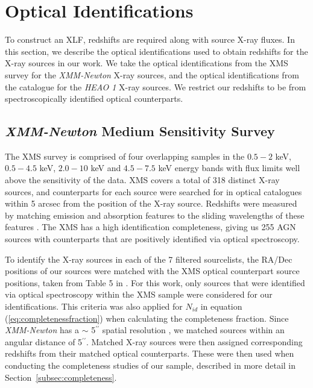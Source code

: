 \documentclass[fleqn,usenatbib]{mnras}
\begin{document}
\section{Optical Identifications}\label{sec:opticalid}

To construct an XLF, redshifts are required along with source X-ray fluxes. 
In this section, we describe the optical identifications used to obtain redshifts for the X-ray sources in our work.
We take the optical identifications from the XMS survey for the \textit{XMM-Newton} X-ray sources, and the optical identifications from the \cite{piccinotti1982heao1xlf} catalogue for the \textit{HEAO 1} X-ray sources.
We restrict our redshifts to be from spectroscopically identified optical counterparts.

	\subsection{\textit{XMM-Newton} Medium Sensitivity Survey}\label{subsec:xmssurvey}  

	The XMS survey is comprised of four overlapping samples in the $0.5-2$ keV, $0.5-4.5$ keV, $2.0-10$ keV and $4.5-7.5$ keV energy bands with flux limits well above the sensitivity of the data. 
	XMS covers a total of 318 distinct X-ray sources, and counterparts for each source were searched for in optical catalogues within 5 arcsec from the position of the X-ray source.
	Redshifts were measured by matching emission and absorption features to the sliding wavelengths of these features \citep{barcons2007xmm}. 
	The XMS has a high identification completeness, giving us 255 AGN sources with counterparts that are positively identified via optical spectroscopy.

    To identify the X-ray sources in each of the 7 filtered sourcelists, the RA/Dec positions of our sources were matched with the XMS optical counterpart source positions, taken from Table 5 in \cite{barcons2007xmm}. 
	For this work, only sources that were identified via optical spectroscopy within the XMS sample were considered for our identifications.
	This criteria was also applied for $N_{id}$ in equation (\ref{eq:completenessfraction}) when calculating the completeness fraction.
	Since \textit{XMM-Newton} has a $\sim$ 5$^{\prime\prime}$ spatial resolution \citep{jansen2001xmm}, we matched sources within an angular distance of 5$^{\prime\prime}$.
	Matched X-ray sources were then assigned corresponding redshifts from their matched optical counterparts.
	These were then used when conducting the completeness studies of our sample, described in more detail in Section~\ref{subsec:completeness}.
    
\end{document}
